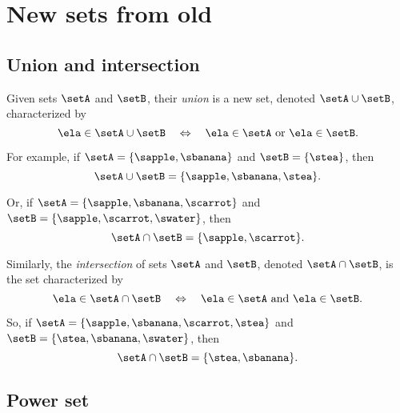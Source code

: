 
\section{New sets from old}


\subsection{Union and intersection}

Given sets $\setA$ and $\setB$, their \emph{union} is a new set, denoted $\setA \cup \setB$, characterized by
\begin{equation*}
    \ela \in \setA \cup \setB \quad \Leftrightarrow \quad \ela \in \setA \ \text{or} \ \ela \in \setB.
\end{equation*}

For example, if $\setA = \{ \sapple, \sbanana \}$ and $\setB = \{ \stea \}$, then
\begin{equation*}
    \setA \cup \setB = \{ \sapple, \sbanana, \stea \}.
\end{equation*}

Or, if $\setA = \{ \sapple, \sbanana, \scarrot \}$ and $\setB = \{ \sapple, \scarrot, \swater \}$, then
\begin{equation*}
    \setA \cap \setB = \{ \sapple, \scarrot \}.
\end{equation*}

Similarly, the \emph{intersection} of sets $\setA$ and $\setB$, denoted $\setA \cap \setB$, is the set characterized by
\begin{equation*}
    \ela \in \setA \cap \setB \quad \Leftrightarrow \quad \ela \in \setA \ \text{and} \ \ela \in \setB.
\end{equation*}

So, if $\setA = \{ \sapple, \sbanana, \scarrot, \stea \}$ and $\setB = \{ \stea, \sbanana, \swater \}$, then
\begin{equation*}
    \setA \cap \setB = \{ \stea, \sbanana \}.
\end{equation*}


\subsection{Power set}
\label{sec:power-set}

